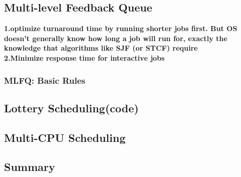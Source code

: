 \documentclass{article}
\begin{document}
\subsection{Multi-level Feedback Queue}
\textbf{\color{red} 1.optimize turnaround time by running shorter jobs first. But OS doesn’t generally know how long a job will run for, exactly the knowledge that algorithms like SJF (or STCF) require\\ 2.Minimize response time for interactive jobs}

\subsubsection{MLFQ: Basic Rules}
\subsection{Lottery Scheduling(code)}
\subsection{Multi-CPU Scheduling}
\subsection{Summary}
\end{document}

